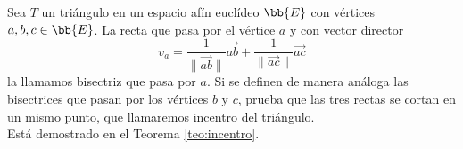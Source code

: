 \begin{ejercicio} 
    Sea $T$ un triángulo en un espacio afín euclídeo $\bb{E}$ con vértices $a, b, c \in \bb{E}$. La recta que pasa por el vértice $a$ y con vector director
    \begin{equation*}
        v_a=\frac{1}{\|\vec{ab}\|} \vec{ab} + \frac{1}{\|\vec{ac}\|}\vec{ac}
    \end{equation*}
    la llamamos bisectriz que pasa por $a$. Si se definen de manera análoga las bisectrices que pasan por los vértices $b$ y $c$,
    prueba que las tres rectas se cortan en un mismo punto, que llamaremos incentro del triángulo.\\

    Está demostrado en el Teorema \ref{teo:incentro}.
\end{ejercicio}


